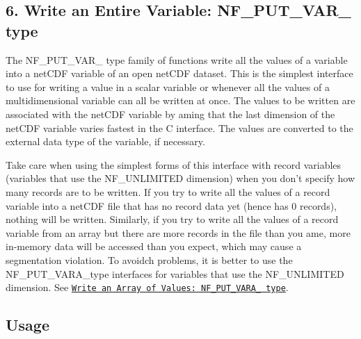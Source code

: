 \subsection*{6. Write an Entire Variable\+: N\+F\+\_\+\+P\+U\+T\+\_\+\+V\+A\+R\+\_\+ type }

The N\+F\+\_\+\+P\+U\+T\+\_\+\+V\+A\+R\+\_\+ type family of functions write all the values of a variable into a net\+C\+DF variable of an open net\+C\+DF dataset. This is the simplest interface to use for writing a value in a scalar variable or whenever all the values of a multidimensional variable can all be written at once. The values to be written are associated with the net\+C\+DF variable by aming that the last dimension of the net\+C\+DF variable varies fastest in the C interface. The values are converted to the external data type of the variable, if necessary.

Take care when using the simplest forms of this interface with record variables (variables that use the N\+F\+\_\+\+U\+N\+L\+I\+M\+I\+T\+ED dimension) when you don’t specify how many records are to be written. If you try to write all the values of a record variable into a net\+C\+DF file that has no record data yet (hence has 0 records), nothing will be written. Similarly, if you try to write all the values of a record variable from an array but there are more records in the file than you ame, more in-\/memory data will be accessed than you expect, which may cause a segmentation violation. To avoidch problems, it is better to use the N\+F\+\_\+\+P\+U\+T\+\_\+\+V\+A\+R\+A\+\_\+type interfaces for variables that use the N\+F\+\_\+\+U\+N\+L\+I\+M\+I\+T\+ED dimension. See \href{#NF_005fPUT_005fVARA_005f-type}{\tt Write an Array of Values\+: N\+F\+\_\+\+P\+U\+T\+\_\+\+V\+A\+R\+A\+\_\+ type}.

\subsection*{Usage }

 

